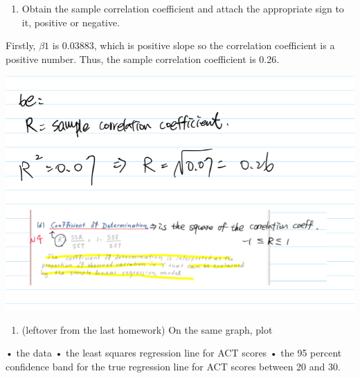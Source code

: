 \documentclass[
]{article}
\newenvironment{Shaded}{\begin{snugshade}}{\end{snugshade}}
\newcommand{\CommentTok}[1]{\textcolor[rgb]{0.56,0.35,0.01}{\textit{#1}}}
\newcommand{\DecValTok}[1]{\textcolor[rgb]{0.00,0.00,0.81}{#1}}
\newcommand{\KeywordTok}[1]{\textcolor[rgb]{0.13,0.29,0.53}{\textbf{#1}}}
\newcommand{\NormalTok}[1]{#1}
\newcommand{\OperatorTok}[1]{\textcolor[rgb]{0.81,0.36,0.00}{\textbf{#1}}}
\newcommand{\StringTok}[1]{\textcolor[rgb]{0.31,0.60,0.02}{#1}}
\providecommand{\tightlist}{%
  \setlength{\itemsep}{0pt}\setlength{\parskip}{0pt}}
\begin{document}
\begin{enumerate}
\def\labelenumi{(\alph{enumi})}
\setcounter{enumi}{4}
\tightlist
\item
  Obtain the sample correlation coefficient and attach the appropriate
  sign to it, positive or negative.
\end{enumerate}

Firstly, \(\beta1\) is 0.03883, which is positive slope so the
correlation coefficient is a positive number. Thus, the sample
correlation coefficient is 0.26.

\includegraphics{pics/Screen Shot 2021-02-19 at 1.59.41 PM.png}

\begin{enumerate}
\def\labelenumi{(\alph{enumi})}
\setcounter{enumi}{5}
\tightlist
\item
  (leftover from the last homework) On the same graph, plot
\end{enumerate}

• the data • the least squares regression line for ACT scores • the 95
percent confidence band for the true regression line for ACT scores
between 20 and 30.

\begin{Shaded}
\end{Shaded}
\end{document}
